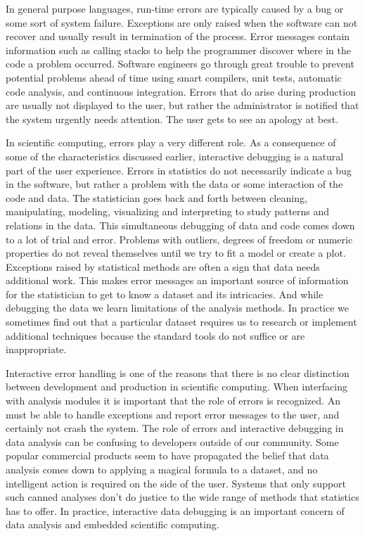 In general purpose languages, run-time errors are typically caused by a bug or some sort of system failure. Exceptions are only raised when the software can not recover and usually result in termination of the process. Error messages contain information such as calling stacks to help the programmer discover where in the code a problem occurred. Software engineers go through great trouble to prevent potential problems ahead of time using smart compilers, unit tests, automatic code analysis, and continuous integration. Errors that do arise during production are usually not displayed to the user, but rather the administrator is notified that the system urgently needs attention. The user gets to see an apology at best.

In scientific computing, errors play a very different role. As a consequence of some of the characteristics discussed earlier, interactive debugging is a natural part of the user experience. Errors in statistics do not necessarily indicate a bug in the software, but rather a problem with the data or some interaction of the code and data. The statistician goes back and forth between cleaning, manipulating, modeling, visualizing and interpreting to study patterns and relations in the data. This simultaneous debugging of data and code comes down to a lot of trial and error. Problems with outliers, degrees of freedom or numeric properties do not reveal themselves until we try to fit a model or create a plot. Exceptions raised by statistical methods are often a sign that data needs additional work. This makes error messages an important source of information for the statistician to get to know a dataset and its intricacies. And while debugging the data we learn limitations of the analysis methods. In practice we sometimes find out that a particular dataset requires us to research or implement additional techniques because the standard tools do not suffice or are inappropriate.

Interactive error handling is one of the reasons that there is no clear distinction between development and production in scientific computing. When interfacing with analysis modules it is important that the role of errors is recognized. An \API must be able to handle exceptions and report error messages to the user, and certainly not crash the system. The role of errors and interactive debugging in data analysis can be confusing to developers outside of our community. Some popular commercial products seem to have propagated the belief that data analysis comes down to applying a magical formula to a dataset, and no intelligent action is required on the side of the user. Systems that only support such canned analyses don't do justice to the wide range of methods that statistics has to offer. In practice, interactive data debugging is an important concern of data analysis and embedded scientific computing.

